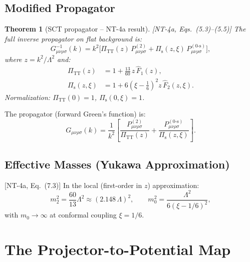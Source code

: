 \documentclass[11pt,a4paper]{article}
\theoremstyle{plain}
\newtheorem{theorem}{Theorem}[section]
\theoremstyle{definition}
\theoremstyle{remark}
\newcommand{\fromlit}[1]{\textcolor{blue!70!black}{\textsf{[#1]}}}
\begin{document}
\subsection{Modified Propagator}

\begin{theorem}[SCT propagator -- NT-4a result]\label{thm:sct-prop}
\fromlit{NT-4a, Eqs.~(5.3)--(5.5)}
The full inverse propagator on flat background is:
\begin{equation}\label{eq:G-inv-full}
  \boxed{G^{-1}_{\mu\nu\rho\sigma}(k)
  = k^2\Big[\Pi_{\mathrm{TT}}(z)\, P^{(2)}_{\mu\nu\rho\sigma}
  + \Pi_{\mathrm{s}}(z,\xi)\, P^{(0\text{-s})}_{\mu\nu\rho\sigma}\Big],}
\end{equation}
where $z = k^2/\Lambda^2$ and:
\begin{align}
  \Pi_{\mathrm{TT}}(z)
  &= 1 + \frac{13}{60}\,z\,\hat{F}_1(z),
  \label{eq:Pi-TT}\\
  \Pi_{\mathrm{s}}(z,\xi)
  &= 1 + 6\left(\xi - \tfrac{1}{6}\right)^2 z\,\hat{F}_2(z,\xi).
  \label{eq:Pi-s}
\end{align}
Normalization: $\Pi_{\mathrm{TT}}(0) = 1$,
$\Pi_{\mathrm{s}}(0,\xi) = 1$.
\end{theorem}

The propagator (forward Green's function) is:
\begin{equation}\label{eq:G-full}
  G_{\mu\nu\rho\sigma}(k)
  = \frac{1}{k^2}\left[
    \frac{P^{(2)}_{\mu\nu\rho\sigma}}{\Pi_{\mathrm{TT}}(z)}
    + \frac{P^{(0\text{-s})}_{\mu\nu\rho\sigma}}{\Pi_{\mathrm{s}}(z,\xi)}
  \right].
\end{equation}

\subsection{Effective Masses (Yukawa Approximation)}

\fromlit{NT-4a, Eq.~(7.3)}
In the local (first-order in $z$) approximation:
\begin{equation}\label{eq:eff-masses}
  m_2^2 = \frac{60}{13}\Lambda^2
  \approx (2.148\,\Lambda)^2,
  \qquad
  m_0^2 = \frac{\Lambda^2}{6(\xi - 1/6)^2},
\end{equation}
with $m_0 \to \infty$ at conformal coupling $\xi = 1/6$.

\section{The Projector-to-Potential Map}\label{sec:proj-pot}
\end{document}

